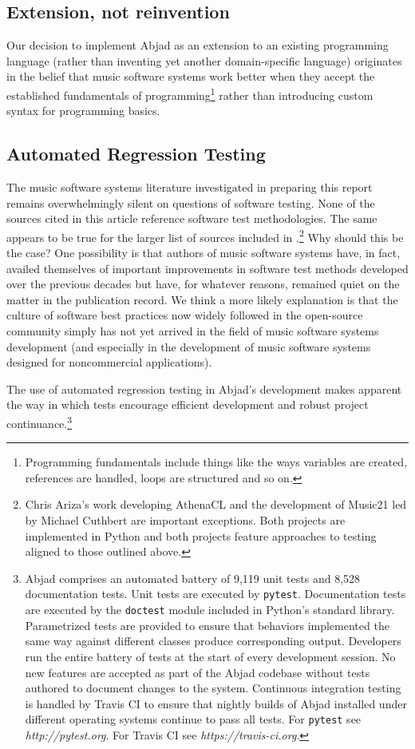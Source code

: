 \documentclass{article}
\begin{document}
\subsection{Extension, not reinvention}

Our decision to implement Abjad as an extension to an existing
programming language (rather than inventing yet another domain-specific
language) originates in the belief that music software systems work better when
they accept the established fundamentals of programming\footnote{Programming
fundamentals include things like the ways variables are created, references are
handled, loops are structured and so on.} rather than introducing custom syntax
for programming basics.

\subsection{Automated Regression Testing}

The music software systems literature investigated in preparing this report
remains overwhelmingly silent on questions of software testing. None of the
sources cited in this article reference software test methodologies. The same
appears to be true for the larger list of sources included in
\cite{trevino2013compositional}.\footnote{Chris Ariza's work developing
AthenaCL \cite{Ariza2005} and the development of Music21 \cite{Ariza2010} led
by Michael Cuthbert are important exceptions. Both projects are implemented in
Python and both projects feature approaches to testing aligned to those
outlined above.} Why should this be the case? One possibility is that authors
of music software systems have, in fact, availed themselves of important
improvements in software test methods developed over the previous decades but
have, for whatever reasons, remained quiet on the matter in the publication
record. We think a more likely explanation is that the culture of software best
practices now widely followed in the open-source community simply has not yet
arrived in the field of music software systems development (and especially in
the development of music software systems designed for noncommercial
applications).

The use of automated regression testing in Abjad's development makes apparent
the way in which tests encourage efficient development and robust project
continuance.\footnote{Abjad comprises an automated battery of 9,119 unit tests
and 8,528 documentation tests. Unit tests are executed by \texttt{pytest}.
Documentation tests are executed by the \texttt{doctest} module included in
Python's standard library. Parametrized tests are provided to ensure that
behaviors implemented the same way against different classes produce
corresponding output. Developers run the entire battery of tests at the start
of every development session. No new features are accepted as part of the Abjad
codebase without tests authored to document changes to the system. Continuous
integration testing is handled by Travis CI to ensure that nightly builds of
Abjad installed under different operating systems continue to pass all tests.
For \texttt{pytest} see \textit{http://pytest.org}. For Travis CI see
\textit{https://travis-ci.org}.}
\end{document}
